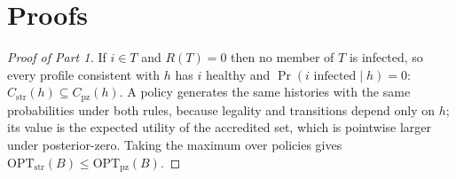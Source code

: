 \documentclass[11pt]{article}
\theoremstyle{remark}
\newcommand{\pz}{\mathrm{pz}}
\newcommand{\str}{\mathrm{str}}
\newcommand{\OPT}{\mathrm{OPT}}
\newcommand{\Cstr}{C_{\str}}
\newcommand{\Cpz}{C_{\pz}}
\begin{document}
\section{Proofs}

\begin{proof}[Proof of Part 1]
If $i\in T$ and $R(T)=0$ then no member of $T$ is infected, so every profile consistent with $h$ has $i$ healthy and $\Pr(i\text{ infected}\mid h)=0$: $\Cstr(h)\subseteq\Cpz(h)$. A policy generates the same histories with the same probabilities under both rules, because legality and transitions depend only on $h$; its value is the expected utility of the accredited set, which is pointwise larger under posterior-zero. Taking the maximum over policies gives $\OPT_\str(B)\le\OPT_\pz(B)$.
\end{proof}
\end{document}
